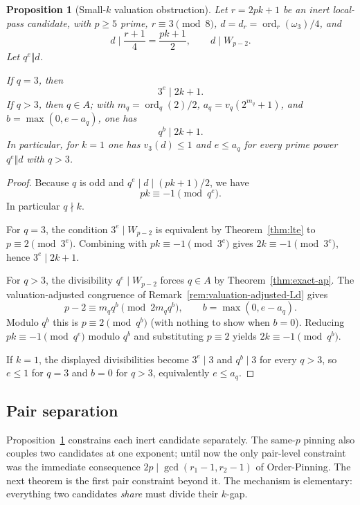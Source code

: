 \documentclass[11pt]{amsart}
\theoremstyle{plain}
\newtheorem{proposition}[theorem]{Proposition}
\theoremstyle{definition}
\theoremstyle{remark}
\numberwithin{equation}{section}
\newcommand{\ord}{\operatorname{ord}}
\begin{document}
\begin{proposition}[Small-$k$ valuation obstruction]\label{prop:small-k-valuation}
Let $r=2pk+1$ be an inert local-pass candidate, with $p\geq5$ prime, $r\equiv3\pmod8$, $d=d_r=\ord_r(\omega_3)/4$, and
\[
  d\mid \frac{r+1}{4}=\frac{pk+1}{2},
  \qquad
  d\mid W_{p-2}.
\]
Let $q^e\Vert d$.

If $q=3$, then
\[
  3^e\mid 2k+1.
\]
If $q>3$, then $q\in A$; with $m_q=\ord_q(2)/2$, $a_q=v_q(2^{m_q}+1)$, and $b=\max(0,e-a_q)$, one has
\[
  q^b\mid 2k+1.
\]
In particular, for $k=1$ one has $v_3(d)\leq1$ and $e\leq a_q$ for every prime power $q^e\Vert d$ with $q>3$.
\end{proposition}

\begin{proof}
Because $q$ is odd and $q^e\mid d\mid(pk+1)/2$, we have
\[
  pk\equiv -1 \pmod {q^e}.
\]
In particular $q\nmid k$.

For $q=3$, the condition $3^e\mid W_{p-2}$ is equivalent by Theorem~\ref{thm:lte} to $p\equiv2\pmod{3^e}$. Combining with $pk\equiv-1\pmod{3^e}$ gives $2k\equiv-1\pmod{3^e}$, hence $3^e\mid2k+1$.

For $q>3$, the divisibility $q^e\mid W_{p-2}$ forces $q\in A$ by Theorem~\ref{thm:exact-ap}. The valuation-adjusted congruence of Remark~\ref{rem:valuation-adjusted-Ld} gives
\[
  p-2\equiv m_q q^b \pmod {2m_q q^b},\qquad b=\max(0,e-a_q).
\]
Modulo $q^b$ this is $p\equiv2\pmod {q^b}$ (with nothing to show when $b=0$). Reducing $pk\equiv-1\pmod {q^e}$ modulo $q^b$ and substituting $p\equiv2$ yields $2k\equiv-1\pmod {q^b}$.

If $k=1$, the displayed divisibilities become $3^e\mid3$ and $q^b\mid3$ for every $q>3$, so $e\leq1$ for $q=3$ and $b=0$ for $q>3$, equivalently $e\leq a_q$.
\end{proof}

\subsection{Pair separation}\label{sec:pair-separation}

Proposition~\ref{prop:small-k-valuation} constrains each inert candidate separately. The same-$p$ pinning also couples two candidates at one exponent; until now the only pair-level constraint was the immediate consequence $2p \mid \gcd(r_1 - 1, r_2 - 1)$ of Order-Pinning. The next theorem is the first pair constraint beyond it. The mechanism is elementary: everything two candidates \emph{share} must divide their $k$-gap.
\end{document}
